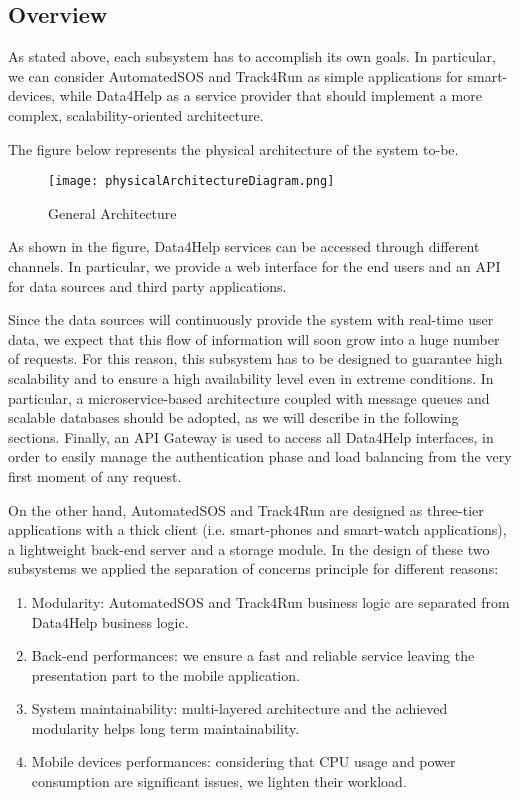 \subsection{Overview}
As stated above, each subsystem has to accomplish its own goals. In particular, we can consider AutomatedSOS and Track4Run as simple  applications for smart-devices, while Data4Help as a service provider that should implement a more complex, scalability-oriented architecture.

The figure below represents the physical architecture of the system to-be.

\FloatBarrier
\begin{figure}[!h]
	\centering
	\texttt{[image: physicalArchitectureDiagram.png]}
	\caption{General Architecture}
\end{figure}
\FloatBarrier

As shown in the figure, Data4Help services can be accessed through different channels. In particular, we provide a web interface for the end users and an API for data sources and third party applications.

Since the data sources will continuously provide the system with real-time user data, we expect that this flow of information will soon grow into a huge number of requests. For this reason, this subsystem has to be designed to guarantee high scalability and to ensure a high availability level even in extreme conditions.
In particular, a microservice-based architecture coupled with message queues and scalable databases should be adopted, as we will describe in the following sections. Finally, an API Gateway is used to access all Data4Help interfaces, in order to easily manage the authentication phase and load balancing from the very first moment of any request.

On the other hand, AutomatedSOS and Track4Run are designed as three-tier applications with a thick client (i.e. smart-phones and smart-watch applications), a lightweight back-end server and a storage module. 
In the design of these two subsystems we applied the separation of concerns principle for different reasons:

\begin{enumerate}
    \item Modularity: AutomatedSOS and Track4Run business logic are separated from Data4Help business logic.
    \item Back-end performances: we ensure a fast and reliable service leaving the presentation part to the mobile application.
    \item System maintainability: multi-layered architecture and the achieved modularity helps long term maintainability.
    \item Mobile devices performances: considering that CPU usage and power consumption are significant issues, we lighten their workload.
\end{enumerate}


